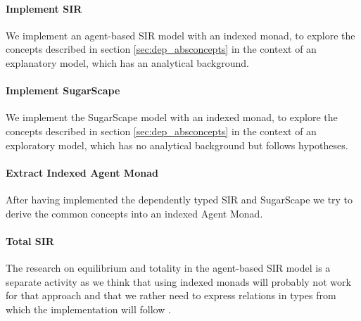 \paragraph{Implement SIR}
We implement an agent-based SIR model with an indexed monad, to explore the concepts described in section \ref{sec:dep_absconcepts} in the context of an explanatory model, which has an analytical background.

\paragraph{Implement SugarScape}
We implement the SugarScape model with an indexed monad, to explore the concepts described in section \ref{sec:dep_absconcepts} in the context of an exploratory model, which has no analytical background but follows hypotheses.

\paragraph{Extract Indexed Agent Monad}
After having implemented the dependently typed SIR and SugarScape we try to derive the common concepts into an indexed Agent Monad.

\paragraph{Total SIR}
The research on equilibrium and totality in the agent-based SIR model is a separate activity as we think that using indexed monads will probably not work for that approach and that we rather need to express relations in types from which the implementation will follow  .

%

